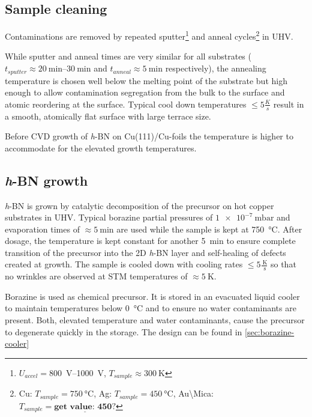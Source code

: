 \subsection{Sample cleaning}
\label{sec:sample-cleaning}
Contaminations 
are removed by repeated sputter\footnote{$U_{accel}=$\SIrange{800}{1000}{\volt}, $T_{sample}\approx \SI{300}{\kelvin}$} and anneal cycles\footnote{Cu: $T_{sample}=\SI{750}{\celsius}$, Ag: $T_{sample}=\SI{450}{\celsius}$, Au\textbackslash Mica: $T_{sample}= \underline{\textbf{get value: 450?}}$} in UHV. 

While sputter and anneal times are very similar for all substrates ($t_{sputter}\approx \SIrange{20}{30}{\minute}$ and $t_{anneal}\approx \SI{5}{\minute}$ respectively), the annealing temperature is chosen well below the melting point of the substrate but high enough to allow contamination segregation from the bulk to the surface and atomic reordering at the surface. Typical cool down temperatures $\leq 5 \frac{K}{s}$ result in a smooth, atomically flat surface with large terrace size. 

Before CVD growth of \textit{h}-BN on Cu(111)/Cu-foils the temperature is higher to accommodate for the elevated growth temperatures.

\subsection{\textit{h}-BN growth}
\label{sec:h-BN-growth}
\textit{h}-BN is grown by catalytic decomposition of the  precursor on hot copper substrates in UHV. Typical borazine partial pressures of $\SI{1e-7}{\milli \bar}$ and evaporation times of $\approx \SI{5}{\minute}$ are used while the sample is kept at \SI{750}{\celsius}. After dosage, the temperature is kept constant for another \SI{5}{\minute} to ensure complete transition of the precursor into the 2D \textit{h}-BN layer and self-healing of defects created at growth. The sample is cooled down with cooling rates $\leq 5 \frac{\SI{}{\kelvin}}{\SI{}{\second}}$ so that no wrinkles are observed at STM temperatures of $\approx \SI{5}{\kelvin}$.

Borazine is used as chemical precursor. It is stored in an evacuated liquid cooler to maintain temperatures below \SI{0}{\celsius} and to ensure no water contaminants are present. Both, elevated temperature and water contaminants, cause the precursor to degenerate quickly in the storage. The design can be found in \autoref{sec:borazine-cooler}

